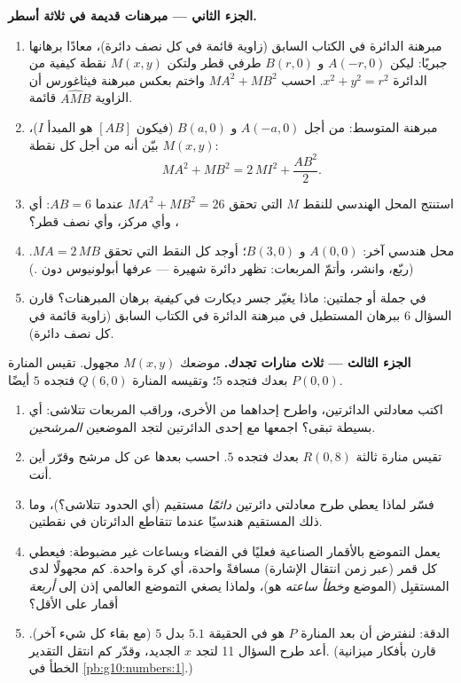 \begin{problem}
\medskip
\noindent\textbf{الجزء الثاني --- مبرهنات قديمة في ثلاثة أسطر.}
\begin{enumerate}[resume]
  \item مبرهنة الدائرة في الكتاب السابق (زاوية قائمة في كل نصف دائرة)،
        معادًا برهانها جبريًا: ليكن $A(-r, 0)$ و $B(r, 0)$
        طرفي قطر ولتكن $M(x, y)$ نقطة كيفية من
        الدائرة $x^2 + y^2 = r^2$. احسب $MA^2 + MB^2$
        واختم بعكس مبرهنة فيثاغورس أن الزاوية
        $\widehat{AMB}$ قائمة.
  \item مبرهنة المتوسط: من أجل $A(-a, 0)$ و $B(a, 0)$ (فيكون
         $[AB]$ هو المبدأ $I$)، بيّن أنه من أجل
        كل نقطة $M(x, y)$:
        \[
        MA^2 + MB^2 = 2\,MI^2 + \frac{AB^2}{2} .
        \]
  \item استنتج المحل الهندسي للنقط $M$ التي تحقق
        $MA^2 + MB^2 = 26$ عندما $AB = 6$: أي ، وأي
        مركز، وأي نصف قطر؟
  \item محل هندسي آخر: $A(0,0)$ و $B(3,0)$؛ أوجد كل النقط
        التي تحقق $MA = 2\,MB$. (ربّع، وانشر، وأتمّ
        المربعات: تظهر دائرة شهيرة --- عرفها أبولونيوس
        دون .)
  \item في جملة أو جملتين: ماذا يغيّر جسر ديكارت في
        \emph{كيفية} برهان المبرهنات؟ قارن
        السؤال 6 ببرهان المستطيل في
        مبرهنة الدائرة في الكتاب السابق (زاوية قائمة في كل نصف دائرة).
\end{enumerate}

\medskip
\noindent\textbf{الجزء الثالث --- ثلاث منارات تجدك.}
موضعك $M(x, y)$ مجهول. تقيس المنارة $P(0, 0)$
بعدك فتجده $5$؛ وتقيسه المنارة $Q(6, 0)$ فتجده $5$ أيضًا.
\begin{enumerate}[resume]
  \item اكتب معادلتي الدائرتين، واطرح إحداهما من الأخرى، وراقب
        المربعات تتلاشى: أي  بسيطة تبقى؟
        اجمعها مع إحدى الدائرتين لتجد الموضعين
        \emph{المرشحين}.
  \item تقيس منارة ثالثة $R(0, 8)$ بعدك فتجده $5$.
        احسب بعدها عن كل مرشح وقرّر أين
        أنت.
  \item فسّر لماذا يعطي طرح معادلتي دائرتين
        \emph{دائمًا}  مستقيم (أي الحدود
        تتلاشى؟)، وما ذلك المستقيم هندسيًا عندما
        تتقاطع الدائرتان في نقطتين.
  \item يعمل التموضع بالأقمار الصناعية فعليًا في الفضاء وبساعات
        غير مضبوطة: فيعطي كل قمر (عبر زمن انتقال
        الإشارة) مسافةً واحدة، أي كرة واحدة. كم مجهولًا
        لدى المستقبِل (الموضع \emph{وخطأ ساعته} هو)،
        ولماذا يصغي التموضع العالمي إذن إلى \emph{أربعة}
        أقمار على الأقل؟
  \item الدقة: لنفترض أن بعد المنارة $P$ هو في الحقيقة
        $5.1$ بدل $5$ (مع بقاء كل شيء آخر). أعد
        طرح السؤال 11 لتجد $x$ الجديد، وقدّر
        كم انتقل التقدير. (قارن بأفكار ميزانية
        الخطأ في \cref{pb:g10:numbers:1}.)
\end{enumerate}


\end{problem}
